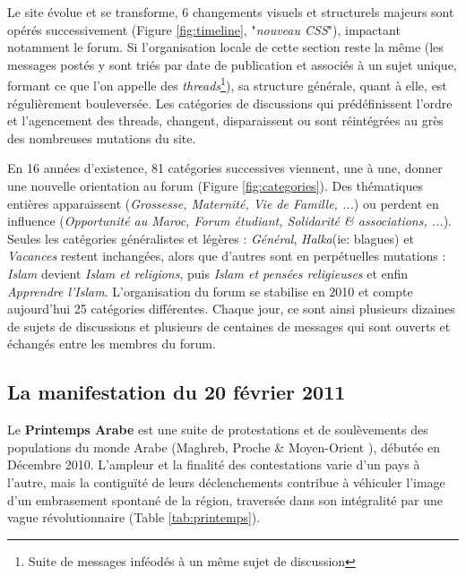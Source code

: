 \documentclass[symmetric,justified,marginals=raggedouter]{tufte-book}
\begin{document}
Le site évolue et se transforme, 6 changements visuels et structurels majeurs sont opérés successivement (Figure \ref{fig:timeline}, "\textit{nouveau CSS}"), impactant notamment le forum. Si l'organisation locale de cette section reste la même (les messages postés y sont triés par date de publication et associés à un sujet unique, formant ce que l'on appelle des \textit{threads}\footnote{Suite de messages inféodés à un même sujet de discussion}), sa structure générale, quant à elle, est régulièrement bouleversée. Les catégories de discussions qui prédéfinissent l'ordre et l'agencement des threads, changent, disparaissent ou sont réintégrées au grès des nombreuses mutations du site. 

En 16 années d'existence, 81 catégories successives viennent, une à une, donner une nouvelle orientation au forum (Figure \ref{fig:categories}). Des thématiques entières apparaissent (\textit{Grossesse, Maternité, Vie de Famille, ...}) ou perdent en influence (\textit{Opportunité au Maroc, Forum étudiant, Solidarité \& associations, ...}). Seules les catégories généralistes et légères : \textit{Général}, \textit{Halka}(ie: blagues) et \textit{Vacances} restent inchangées, alors que d'autres sont en perpétuelles mutations : \textit{Islam} devient \textit{Islam et religions}, puis \textit{Islam et pensées religieuses} et enfin \textit{Apprendre l'Islam}. L'orga\-nisation du forum se stabilise en 2010 et compte aujourd'hui 25 catégories différentes. Chaque jour, ce sont ainsi plusieurs dizaines de sujets de discussions et plusieurs de centaines de messages qui sont ouverts et échangés entre les membres du forum. 

\subsection{La manifestation du 20 février 2011}

\noindent Le \textbf{Printemps Arabe} est une suite de protestations et de soulèvements des populations du monde Arabe (Maghreb, Proche \& Moyen-Orient ), débutée en Décembre 2010. L'ampleur et la finalité des contestations varie d'un pays à l'autre, mais la contiguïté de leurs déclenchements contribue à véhiculer l'image d'un embrasement spontané de la région, traversée dans son intégralité par une vague révolutionnaire (Table \ref{tab:printemps}).  
\end{document}

